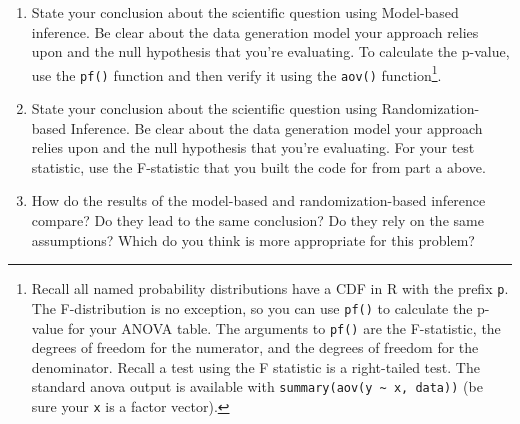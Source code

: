 \documentclass[
  letterpaper,
  DIV=11,
  numbers=noendperiod]{scrartcl}
\begin{document}
\begin{enumerate}
  \begin{enumerate}
  \def\labelenumii{\alph{enumii}.}
  \setcounter{enumii}{2}
  \item
    State your conclusion about the scientific question using
    Model-based inference. Be clear about the data generation model your
    approach relies upon and the null hypothesis that you're evaluating.
    To calculate the p-value, use the \texttt{pf()} function and then
    verify it using the \texttt{aov()} function\footnote{Recall all
      named probability distributions have a CDF in R with the prefix
      \texttt{p}. The F-distribution is no exception, so you can use
      \texttt{pf()} to calculate the p-value for your ANOVA table. The
      arguments to \texttt{pf()} are the F-statistic, the degrees of
      freedom for the numerator, and the degrees of freedom for the
      denominator. Recall a test using the F statistic is a right-tailed
      test. The standard anova output is available with
      \texttt{summary(aov(y\ \textasciitilde{}\ x,\ data))} (be sure
      your \texttt{x} is a factor vector).}.
  \item
    State your conclusion about the scientific question using
    Randomization-based Inference. Be clear about the data generation
    model your approach relies upon and the null hypothesis that you're
    evaluating. For your test statistic, use the F-statistic that you
    built the code for from part a above.
  \item
    How do the results of the model-based and randomization-based
    inference compare? Do they lead to the same conclusion? Do they rely
    on the same assumptions? Which do you think is more appropriate for
    this problem?
  \end{enumerate}
\end{enumerate}
\end{document}
